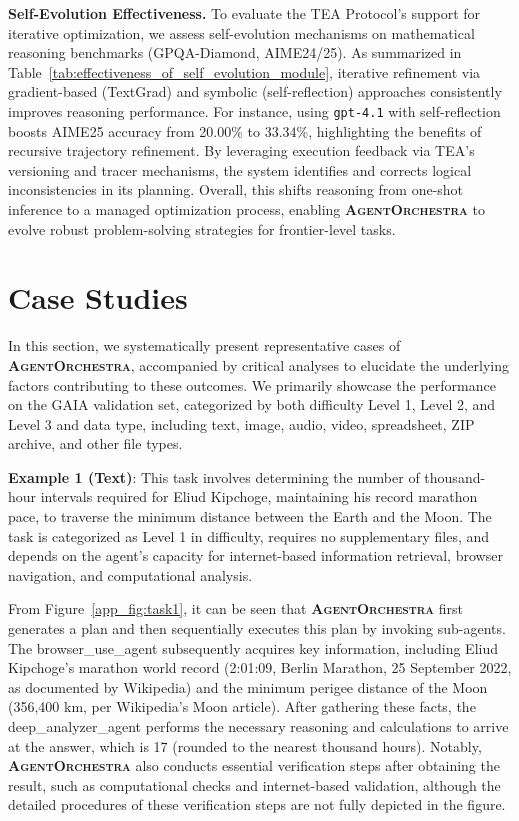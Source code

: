 \documentclass[11pt]{article}
\newcommand{\projectname}{\textbf{\textsc{AgentOrchestra}}\xspace}
\begin{document}
\textbf{Self-Evolution Effectiveness.} To evaluate the TEA Protocol's support for iterative optimization, we assess self-evolution mechanisms on mathematical reasoning benchmarks (GPQA-Diamond, AIME24/25). As summarized in Table~\ref{tab:effectiveness_of_self_evolution_module}, iterative refinement via gradient-based (TextGrad) and symbolic (self-reflection) approaches consistently improves reasoning performance. For instance, using \texttt{gpt-4.1} with self-reflection boosts AIME25 accuracy from 20.00\% to 33.34\%, highlighting the benefits of recursive trajectory refinement. By leveraging execution feedback via TEA’s versioning and tracer mechanisms, the system identifies and corrects logical inconsistencies in its planning. Overall, this shifts reasoning from one-shot inference to a managed optimization process, enabling \projectname to evolve robust problem-solving strategies for frontier-level tasks.


\section{Case Studies}
\label{app_sec:case_study}
In this section, we systematically present representative cases of \projectname, accompanied by critical analyses to elucidate the underlying factors contributing to these outcomes. We primarily showcase the performance on the GAIA validation set, categorized by both difficulty Level 1, Level 2, and Level 3 and data type, including text, image, audio, video, spreadsheet, ZIP archive, and other file types.

\textbf{Example 1 (Text)}: This task involves determining the number of thousand-hour intervals required for Eliud Kipchoge, maintaining his record marathon pace, to traverse the minimum distance between the Earth and the Moon. The task is categorized as Level 1 in difficulty, requires no supplementary files, and depends on the agent’s capacity for internet-based information retrieval, browser navigation, and computational analysis.

From Figure~\ref{app_fig:task1}, it can be seen that \projectname first generates a plan and then sequentially executes this plan by invoking sub-agents. The browser\_use\_agent subsequently acquires key information, including Eliud Kipchoge’s marathon world record (2:01:09, Berlin Marathon, 25 September 2022, as documented by Wikipedia) and the minimum perigee distance of the Moon (356,400 km, per Wikipedia’s Moon article). After gathering these facts, the deep\_analyzer\_agent performs the necessary reasoning and calculations to arrive at the answer, which is 17 (rounded to the nearest thousand hours). Notably, \projectname also conducts essential verification steps after obtaining the result, such as computational checks and internet-based validation, although the detailed procedures of these verification steps are not fully depicted in the figure.
\end{document}

